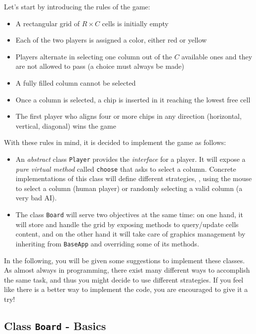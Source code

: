 \documentclass{article}
\begin{document}
Let's start by introducing the rules of the game:
\begin{itemize}
  \item A rectangular grid of $R\times C$ cells is initially empty
  \item Each of the two players is assigned a color, either red or yellow
  \item Players alternate in selecting one column out of the $C$ available ones and they are not allowed to pass (a choice must always be made)
  \item A fully filled column cannot be selected
  \item Once a column is selected, a chip is inserted in it reaching the lowest free cell
  \item The first player who aligns four or more chips in any direction (horizontal, vertical, diagonal) wins the game
\end{itemize}
With these rules in mind, it is decided to implement the game as follows:
\begin{itemize}
  \item An \emph{abstract} class \texttt{Player} provides the \emph{interface} for a player. It will expose a \emph{pure virtual method} called \texttt{choose} that asks to select a column. Concrete implementations of this class will define different strategies, \eg, using the mouse to select a column (human player) or randomly selecting a valid column (a very bad AI).
  \item The class \texttt{Board} will serve two objectives at the same time: on one hand, it will store and handle the grid by exposing methods to query/update cells content, and on the other hand it will take care of graphics management by inheriting from \texttt{BaseApp} and overriding some of its methods. 
\end{itemize}

In the following, you will be given some suggestions to implement these classes. As almost always in programming, there exist many different ways to accomplish the same task, and thus you might decide to use different strategies. If you feel like there is a better way to implement the code, you are encouraged to give it a try!






\subsection{Class \texttt{Board} - Basics}
\end{document}
